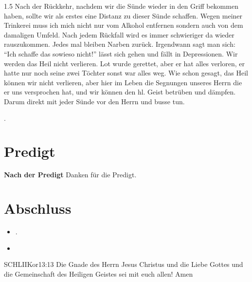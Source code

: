 \documentclass[fontsize=14pt]{../../inc/mybib}
\begin{document}
\begin{spacing}{1.5}
    Nach der Rückkehr, nachdem wir die Sünde wieder in den Griff bekommen haben, sollte wir als erstes eine Distanz zu dieser Sünde schaffen. Wegen meiner Trinkerei muss ich mich nicht nur vom Alkohol entfernen sondern auch von dem damaligen Umfeld. Nach jedem Rückfall wird es immer schwieriger da wieder rauszukommen. Jedes mal bleiben Narben zurück. Irgendwann sagt man sich: \enquote{Ich schaffe das sowieso nicht!} lässt sich gehen und fällt in Depressionen.  Wir werden das Heil nicht verlieren. Lot wurde gerettet, aber er hat alles verloren, er hatte nur noch seine zwei Töchter sonst war alles weg. Wie schon gesagt, das Heil können wir nicht verlieren, aber hier im Leben die Segnungen unseres Herrn die er uns versprochen hat, und wir können den hl. Geist betrüben und dämpfen. Darum direkt mit jeder Sünde vor den Herrn und busse tun.

    \begin{otsblock}
    \end{otsblock}
    \begin{otsblock}[Massada]
    \end{otsblock}
    .
\end{spacing}
\section{Predigt}
\textbf{Nach der Predigt}\newline
Danken für die Predigt.
\section{Abschluss}
\begin{itemize}
    \item [] .
    \item [] 
\end{itemize}
\begin{bibelbox}{SCHL}{IIKor}{13:13}
    Die Gnade des Herrn Jesus Christus und die Liebe Gottes und die Gemeinschaft des Heiligen Geistes sei mit euch allen! Amen
\end{bibelbox}
\end{document}
